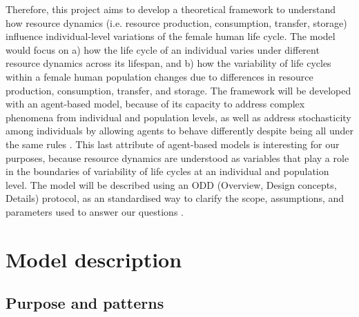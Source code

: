 \documentclass{article}
\begin{document}
Therefore, this project aims to develop a theoretical framework to understand how resource dynamics (i.e. resource production, consumption, transfer, storage) influence individual-level variations of the female human life cycle. The model would focus on a) how the life cycle of an individual varies under different resource dynamics across its lifespan, and b) how the variability of life cycles within a female human population changes due to differences in resource production, consumption, transfer, and storage. The framework will be developed with an agent-based model, because of its capacity to address complex phenomena from individual and population levels, as well as address stochasticity among individuals by allowing agents to behave differently despite being all under the same rules \citep{judson1994rise,wilensky2015introduction}. This last attribute of agent-based models is interesting for our purposes, because resource dynamics are understood as variables that play a role in the boundaries of variability of life cycles at an individual and population level. The model will be described using an ODD (Overview, Design concepts, Details) protocol, as an standardised way to clarify the scope, assumptions, and parameters used to answer our questions \citep{grimm2006standard,grimm2020odd}.

\section{Model description}

\subsection{Purpose and patterns}
\end{document}
